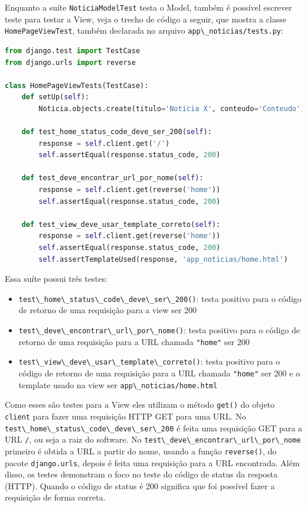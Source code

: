 \documentclass[brazil,a4paper,oneside,openright,parskip=full]{book}
\newcommand{\passthrough}[1]{#1}
\providecommand{\tightlist}{%
  \setlength{\itemsep}{0pt}\setlength{\parskip}{0pt}}
\begin{document}
Enquanto a suíte \passthrough{\lstinline!NoticiaModelTest!} testa o
Model, também é possível escrever teste para testar a View, veja o
trecho de código a seguir, que mostra a classe
\passthrough{\lstinline!HomePageViewTest!}, também declarada no arquivo
\passthrough{\lstinline!app\_noticias/tests.py!}:

\begin{lstlisting}[language=Python]
from django.test import TestCase
from django.urls import reverse

class HomePageViewTests(TestCase):
    def setUp(self):
        Noticia.objects.create(titulo='Noticia X', conteudo='Conteudo')

    def test_home_status_code_deve_ser_200(self):
        response = self.client.get('/')
        self.assertEqual(response.status_code, 200)

    def test_deve_encontrar_url_por_nome(self):
        response = self.client.get(reverse('home'))
        self.assertEqual(response.status_code, 200)

    def test_view_deve_usar_template_correto(self):
        response = self.client.get(reverse('home'))
        self.assertEqual(response.status_code, 200)
        self.assertTemplateUsed(response, 'app_noticias/home.html')
\end{lstlisting}

Essa suíte possui três testes:

\begin{itemize}
\tightlist
\item
  \passthrough{\lstinline!test\_home\_status\_code\_deve\_ser\_200()!}:
  testa positivo para o código de retorno de uma requisição para a view
  ser 200
\item
  \passthrough{\lstinline!test\_deve\_encontrar\_url\_por\_nome()!}:
  testa positivo para o código de retorno de uma requisição para a URL
  chamada \passthrough{\lstinline!"home"!} ser 200
\item
  \passthrough{\lstinline!test\_view\_deve\_usar\_template\_correto()!}:
  testa positivo para o código de retorno de uma requisição para a URL
  chamada \passthrough{\lstinline!"home"!} ser 200 e o template usado na
  view ser \passthrough{\lstinline!app\_noticias/home.html!}
\end{itemize}

Como esses são testes para a View eles utilizam o método
\passthrough{\lstinline!get()!} do objeto
\passthrough{\lstinline!client!} para fazer uma requisição HTTP GET para
uma URL. No
\passthrough{\lstinline!test\_home\_status\_code\_deve\_ser\_200!} é
feita uma requisição GET para a URL \passthrough{\lstinline!/!}, ou seja
a raiz do software. No
\passthrough{\lstinline!test\_deve\_encontrar\_url\_por\_nome!} primeiro
é obtida a URL a partir do nome, usando a função
\passthrough{\lstinline!reverse()!}, do pacote
\passthrough{\lstinline!django.urls!}, depois é feita uma requisição
para a URL encontrada. Além disso, os testes demonstram o foco no teste
do código de status da resposta (HTTP). Quando o código de status é 200
significa que foi possível fazer a requisição de forma correta.
\end{document}
